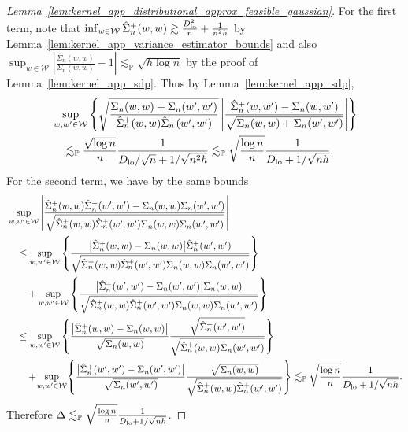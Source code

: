 \documentclass[11pt,lof]{puthesis}
\renewcommand{\P}{\ensuremath{\mathbb{P}}}
\newcommand{\cW}{\ensuremath{\mathcal{W}}}
\newcommand{\Dl}{\ensuremath{D_{\textup{lo}}}}
\theoremstyle{break}
\theoremstyle{proof}
\newtheorem{proof}{Proof}
\begin{document}
\begin{proof}[%
  Lemma~\ref{lem:kernel_app_distributional_approx_feasible_gaussian}]
  For the first term, note that
  $\inf_{w \in \cW} \hat \Sigma_n^+(w,w)
  \gtrsim \frac{\Dl^2}{n} + \frac{1}{n^2h}$
  by Lemma~\ref{lem:kernel_app_variance_estimator_bounds} and also
  $\sup_{w \in \cW}
  \left|\frac{\hat \Sigma_n(w,w)}{\Sigma_n(w,w)} - 1\right|
  \lesssim_\P \sqrt{h \log n}$
  by the proof of Lemma~\ref{lem:kernel_app_sdp}.
  Thus by Lemma~\ref{lem:kernel_app_sdp},
  \begin{align*}
    &\sup_{w, w' \in \cW}
    \left\{
      \sqrt{\frac{\Sigma_n(w,w) + \Sigma_n(w',w')}
      {\hat \Sigma_n^+(w,w) \hat \Sigma_n^+(w',w')}}
      \left|
      \frac{\hat \Sigma_n^+(w,w') - \Sigma_n(w,w')}
      {\sqrt{\Sigma_n(w,w) + \Sigma_n(w',w')}}
      \right|
    \right\} \\
    &\quad\lesssim_\P
    \frac{\sqrt{\log n}}{n}
    \frac{1}{\Dl/\sqrt{n} + 1/\sqrt{n^2h}}
    \lesssim_\P
    \sqrt{\frac{\log n}{n}}
    \frac{1}{\Dl + 1/\sqrt{n h}}.
  \end{align*}
  For the second term, we have by the same bounds
  \begin{align*}
    &\sup_{w, w' \in \cW}
    \left|
    \frac{\hat \Sigma_n^+(w,w) \hat \Sigma_n^+(w',w')
    - \Sigma_n(w,w) \Sigma_n(w',w')}
    {\sqrt{\hat \Sigma_n^+(w,w) \hat \Sigma_n^+(w',w')
    \Sigma_n(w,w) \Sigma_n(w',w')}}
    \right| \\
    &\quad\leq
    \sup_{w, w' \in \cW}
    \left\{
      \frac{\big| \hat \Sigma_n^+(w,w) - \Sigma_n(w,w)\big|
      \hat \Sigma_n^+(w',w')}
      {\sqrt{\hat \Sigma_n^+(w,w) \hat \Sigma_n^+(w',w')
      \Sigma_n(w,w) \Sigma_n(w',w')}}
    \right\} \\
    &\qquad+
    \sup_{w, w' \in \cW}
    \left\{
      \frac{\big| \hat \Sigma_n^+(w',w') - \Sigma_n(w',w')\big|
      \Sigma_n(w,w)}
      {\sqrt{\hat \Sigma_n^+(w,w) \hat \Sigma_n^+(w',w')
      \Sigma_n(w,w) \Sigma_n(w',w')}}
    \right\} \\
    &\quad\leq
    \sup_{w, w' \in \cW}
    \left\{
      \frac{\big| \hat \Sigma_n^+(w,w) - \Sigma_n(w,w)\big|}
      {\sqrt{\Sigma_n(w,w)}}
      \frac{\sqrt{\hat \Sigma_n^+(w',w')}}
      {\sqrt{\hat \Sigma_n^+(w,w) \Sigma_n(w',w')}}
    \right\} \\
    &\qquad+
    \!\sup_{w, w' \in \cW}\!
    \left\{
      \frac{\big| \hat \Sigma_n^+(w',w') - \Sigma_n(w',w')\big|}
      {\sqrt{\Sigma_n(w',w')}}
      \frac{\sqrt{\Sigma_n(w,w)}}
      {\sqrt{\hat \Sigma_n^+(w,w) \hat \Sigma_n^+(w',w')}}
    \right\}
    \lesssim_\P
    \sqrt{\frac{\log n}{n}}
    \frac{1}{\Dl + 1/\sqrt{n h}}.
  \end{align*}
  Therefore $\Delta \lesssim_\P \sqrt{\frac{\log n}{n}} \frac{1}{\Dl + 1/\sqrt{n
  h}}$.


\end{proof}
\end{document}
